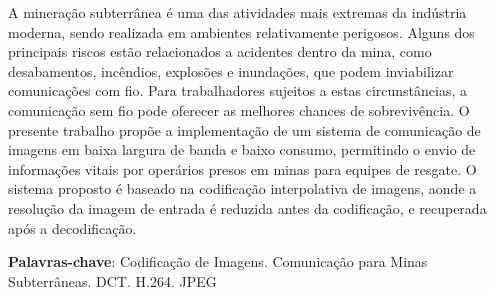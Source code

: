 \begin{resumo}

A mineração subterrânea é uma das atividades mais extremas da indústria moderna, sendo realizada em ambientes relativamente perigosos. Alguns dos principais riscos estão relacionados a acidentes dentro da mina, como desabamentos, incêndios, explosões e inundações, que podem inviabilizar comunicações com fio. Para trabalhadores sujeitos a estas circunstâncias, a comunicação sem fio pode oferecer as melhores chances de sobrevivência. O presente trabalho propõe a implementação de um sistema de comunicação de imagens em baixa largura de banda e baixo consumo, permitindo o envio de informações vitais por operários presos em minas para equipes de resgate. O sistema proposto é baseado na codificação interpolativa de imagens, aonde a resolução da imagem de entrada é reduzida antes da codificação, e recuperada após a decodificação. 


\vspace{\onelineskip}
    
 \noindent
 \textbf{Palavras-chave}: Codificação de Imagens. Comunicação para Minas Subterrâneas. DCT. H.264. JPEG 
\end{resumo}
